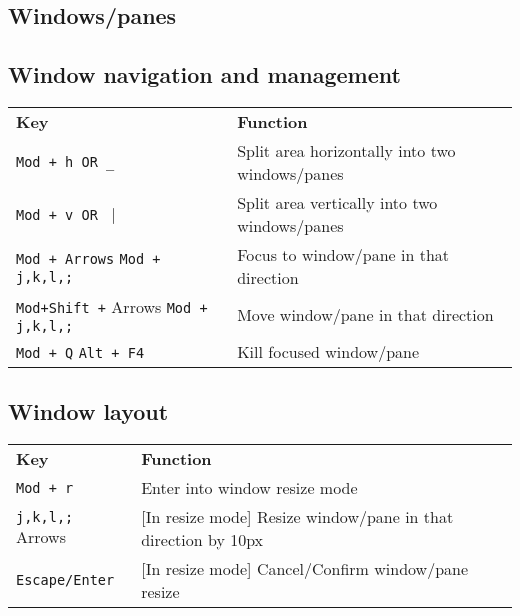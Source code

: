 \documentclass[landscape]{article}
\newcommand{\thead}[1]{{\color{black}\bf#1}}
\newcommand{\blankfirst}{%
  \ifodd\rownum\advance\rownum1\relax\fi}
\begin{document}
\begin{multicols}{3}
  \section*{Windows/panes}
  \subsection*{\color{gray!80}Window navigation and management}
  \blankfirst
  \noindent\begin{tabular}{p{0.8in}p{2.1in}} %
    \thead{Key} & \thead{Function}\\
    \verb|Mod + h OR _ | & Split area horizontally into two windows/panes\\
    \verb|Mod + v OR | | & Split area vertically into two windows/panes\\
    \verb|Mod + Arrows| \verb|Mod + j,k,l,;|& Focus to window/pane in that direction\\
    \verb|Mod+Shift +| Arrows \verb|Mod + j,k,l,;| & Move window/pane in that direction\\
    \verb|Mod + Q| \verb|Alt + F4| & Kill focused window/pane\\
  \end{tabular}
  \subsection*{\color{gray!80}Window layout}
  \blankfirst
  \noindent\begin{tabular}{p{0.8in}p{2.1in}} %
    \thead{Key} & \thead{Function}\\
    \verb|Mod + r| & Enter into window resize mode\\
    \verb|j,k,l,;| Arrows & [In resize mode] Resize window/pane in that direction by 10px\\
    \verb|Escape/Enter| & [In resize mode] Cancel/Confirm window/pane resize\\
  \end{tabular}
  \columnbreak


\end{multicols}
\end{document}
